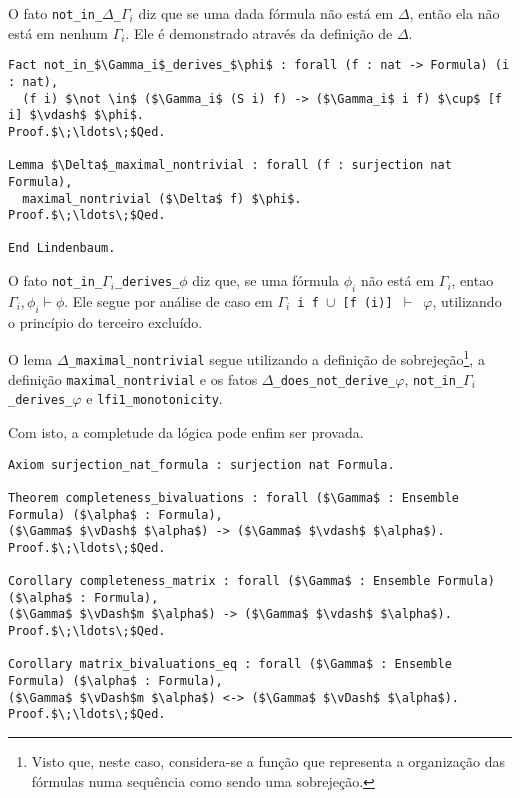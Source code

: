         O fato \texttt{not\_in\_$\Delta$\_$\Gamma_i$} diz que se uma dada fórmula não está em $\Delta$, então ela não está em nenhum $\Gamma_i$. Ele é demonstrado através da definição de $\Delta$.
        
        \begin{lstlisting}[name=Completeness, frame=single, language=coq]
Fact not_in_$\Gamma_i$_derives_$\phi$ : forall (f : nat -> Formula) (i : nat),
  (f i) $\not \in$ ($\Gamma_i$ (S i) f) -> ($\Gamma_i$ i f) $\cup$ [f i] $\vdash$ $\phi$.
Proof.$\;\ldots\;$Qed.

Lemma $\Delta$_maximal_nontrivial : forall (f : surjection nat Formula),
  maximal_nontrivial ($\Delta$ f) $\phi$.
Proof.$\;\ldots\;$Qed.

End Lindenbaum.
        \end{lstlisting}

        O fato \texttt{not\_in\_$\Gamma_i$\_derives\_$\phi$} diz que, se uma fórmula $\phi_i$ não está em $\Gamma_i$, entao $\Gamma_i, \phi_i \vdash \phi$. Ele segue por análise de caso em \texttt{$\Gamma_i$\ i\ f $\cup$ [f (i)] $\vdash$ $\varphi$}, utilizando o princípio do terceiro excluído.
        
        O lema \texttt{$\Delta$\_maximal\_nontrivial} segue utilizando a definição de sobrejeção\footnote{Visto que, neste caso, considera-se a função que representa a organização das fórmulas numa sequência como sendo uma sobrejeção.}, a definição \texttt{maximal\_nontrivial} e os fatos \texttt{$\Delta$\_does\_not\_derive\_$\varphi$}, \texttt{not\_in\_$\Gamma_i$\_derives\_$\varphi$} e \texttt{lfi1\_monotonicity}.

        Com isto, a completude da lógica \lfium{} pode enfim ser provada.

        \begin{lstlisting}[name=Completeness, frame=single, language=coq]
Axiom surjection_nat_formula : surjection nat Formula.

Theorem completeness_bivaluations : forall ($\Gamma$ : Ensemble Formula) ($\alpha$ : Formula), 
($\Gamma$ $\vDash$ $\alpha$) -> ($\Gamma$ $\vdash$ $\alpha$).
Proof.$\;\ldots\;$Qed.
  
Corollary completeness_matrix : forall ($\Gamma$ : Ensemble Formula) ($\alpha$ : Formula), 
($\Gamma$ $\vDash$m $\alpha$) -> ($\Gamma$ $\vdash$ $\alpha$).
Proof.$\;\ldots\;$Qed.

Corollary matrix_bivaluations_eq : forall ($\Gamma$ : Ensemble Formula) ($\alpha$ : Formula),
($\Gamma$ $\vDash$m $\alpha$) <-> ($\Gamma$ $\vDash$ $\alpha$).
Proof.$\;\ldots\;$Qed.
        \end{lstlisting}

